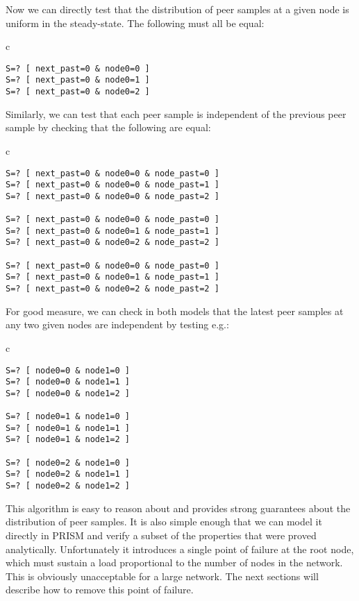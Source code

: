 \documentclass[a4paper,10pt]{article}
\newenvironment{prismprop}[0]{
  \begin{center}
  \begin{tabular}{c}
  \footnotesize
}{
  \end{tabular}
  \end{center}
}
\begin{document}
Now we can directly test that the distribution of peer samples at a given node is uniform in the steady-state. The following must all be equal:

\begin{prismprop}
\begin{lstlisting}
S=? [ next_past=0 & node0=0 ]
S=? [ next_past=0 & node0=1 ]
S=? [ next_past=0 & node0=2 ]
\end{lstlisting}
\end{prismprop}

Similarly, we can test that each peer sample is independent of the previous peer sample by checking that the following are equal:

\begin{prismprop}
\begin{lstlisting}
S=? [ next_past=0 & node0=0 & node_past=0 ]
S=? [ next_past=0 & node0=0 & node_past=1 ]
S=? [ next_past=0 & node0=0 & node_past=2 ]

S=? [ next_past=0 & node0=0 & node_past=0 ]
S=? [ next_past=0 & node0=1 & node_past=1 ]
S=? [ next_past=0 & node0=2 & node_past=2 ]

S=? [ next_past=0 & node0=0 & node_past=0 ]
S=? [ next_past=0 & node0=1 & node_past=1 ]
S=? [ next_past=0 & node0=2 & node_past=2 ]
\end{lstlisting}
\end{prismprop}

For good measure, we can check in both models that the latest peer samples at any two given nodes are independent by testing e.g.:

\begin{prismprop}
\begin{lstlisting}
S=? [ node0=0 & node1=0 ]
S=? [ node0=0 & node1=1 ]
S=? [ node0=0 & node1=2 ]

S=? [ node0=1 & node1=0 ]
S=? [ node0=1 & node1=1 ]
S=? [ node0=1 & node1=2 ]

S=? [ node0=2 & node1=0 ]
S=? [ node0=2 & node1=1 ]
S=? [ node0=2 & node1=2 ]
\end{lstlisting}
\end{prismprop}

This algorithm is easy to reason about and provides strong guarantees about the distribution of peer samples. It is also simple enough that we can model it directly in PRISM and verify a subset of the properties that were proved analytically. Unfortunately it introduces a single point of failure at the root node, which must sustain a load proportional to the number of nodes in the network. This is obviously unacceptable for a large network. The next sections will describe how to remove this point of failure.
\end{document}
